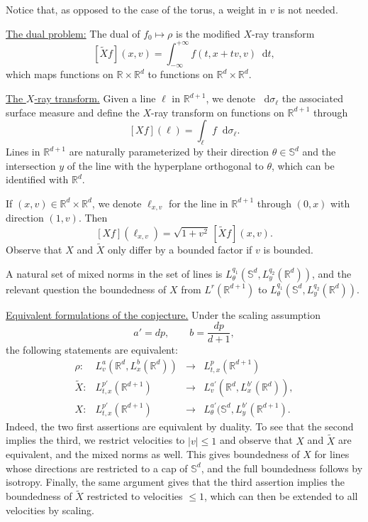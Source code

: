 \documentclass[11pt,a4paper,reqno]{amsart}
\theoremstyle{plain}
\theoremstyle{remark}
\newcommand{\dd}{\mathop{}\!\mathrm{d}}
\begin{document}
Notice that, as opposed to the case of the torus, a weight in $v$ is not needed.

\medskip
\noindent \underline{The dual problem:} The dual of $f_0 \mapsto \rho$ is the modified $X$-ray transform
\[
    [\widetilde{X}f](x,v) = \int_{-\infty}^{+\infty} f(t,x+tv,v) \dd t,
\]
which maps functions on $\mathbb{R}\times\mathbb{R}^{d}$ to functions on $\mathbb{R}^{d}\times\mathbb{R}^d$.

\medskip

\noindent \underline{The $X$-ray transform.} Given a line $\ell$ in $\mathbb{R}^{d+1}$, we denote $\dd \sigma_\ell$ the associated surface measure and define the $X$-ray transform on functions on $\mathbb{R}^{d+1}$ through
\[
    [Xf](\ell) =  \int_\ell f \dd \sigma_\ell.
\]
Lines in $\mathbb{R}^{d+1}$ are naturally parameterized by their direction $\theta \in \mathbb{S}^d$ and the intersection $y$ of the line with the hyperplane orthogonal to $\theta$, which can be identified with $\mathbb{R}^d$. 

If $(x,v) \in \mathbb{R}^d \times \mathbb{R}^d$, we denote $\ell_{x,v}$ for the line in $\mathbb{R}^{d+1}$ through $(0,x)$ with direction $(1,v)$. Then
\[
    [X f](\ell_{x,v}) = \sqrt{1+v^2}\, [\widetilde{X} f](x,v).
\]
Observe that $X$ and $\widetilde{X}$ only differ by a bounded factor if $v$ is bounded.

A natural set of mixed norms in the set of lines is $L^{q_1}_\theta (\mathbb{S}^d,L^{q_2}_y(\mathbb{R}^{d}))$, and the relevant question the boundedness of $X$ from $L^r(\mathbb{R}^{d+1})$ to $L^{q_1}_\theta (\mathbb{S}^d,L^{q_2}_y(\mathbb{R}^{d}))$.

\medskip
\noindent \underline{Equivalent formulations of the conjecture.}
Under the scaling assumption 
\[
    a' =dp, \qquad b = \frac{dp}{d+1},
\]
the following statements are equivalent: 
\begin{equation*}
\begin{array}{rrcl}
    \rho : & L^a_v(\mathbb{R}^d, L^b_x(\mathbb{R}^d)) &\longrightarrow &L^p_{t,x}(\mathbb{R}^{d+1}) \\
    \widetilde{X} : &L^{p'}_{t,x}(\mathbb{R}^{d+1}) &\longrightarrow & L^{a'}_v(\mathbb{R}^d, L^{b'}_x(\mathbb{R}^d)) ,\\
    X : &L^{p'}_{t,x}(\mathbb{R}^{d+1}) &\longrightarrow &L^{a'}_\theta(\mathbb{S}^d, L^{b'}_y (\mathbb{R}^{d+1}).
\end{array}
\end{equation*}
Indeed, the two first assertions are equivalent by duality. To see that the second implies the third, we restrict velocities to $|v| \leq 1$ and observe that $X$ and $\widetilde{X}$ are equivalent, and the mixed norms as well. This gives boundedness of $X$ for lines whose directions are restricted to a cap of $\mathbb{S}^d$, and the full boundedness follows by isotropy. Finally, the same argument gives that the third assertion implies the boundedness of $\widetilde{X}$ restricted to velocities $\leq 1$, which can then be extended to all velocities by scaling.
\end{document}
